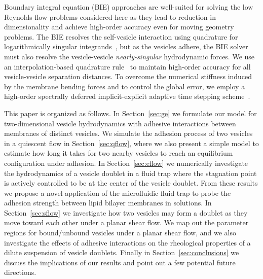 \documentclass[prf,superscriptaddress,showpacs]{revtex4-1}
\begin{document}
Boundary integral equation (BIE) approaches are well-suited for solving
the low Reynolds flow problems considered here as they lead to reduction
in dimensionality and achieve high-order accuracy even for moving
geometry problems. The BIE resolves the self-vesicle interaction using
quadrature for logarithmically singular integrands~\cite{alp1999}, but
as the vesicles adhere, the BIE solver must also resolve the
vesicle-vesicle {\em nearly-singular} hydrodynamic forces.  We use an
interpolation-based quadrature rule~\cite{qua-bir2014} to maintain
high-order accuracy for all vesicle-vesicle separation distances.  To
overcome the numerical stiffness induced by the membrane bending forces
and to control the global error, we employ a high-order spectrally
deferred implicit-explicit adaptive time stepping
scheme~\cite{quaife2016adaptive}. 

This paper is organized as follows. In Section~\ref{sec:ge} we formulate
our model for two-dimensional vesicle hydrodynamics with adhesive
interactions between membranes of distinct vesicles.  We simulate the
adhesion process of two vesicles in a quiescent flow in
Section~\ref{sec:qflow}, where we also present a simple model to
estimate how long it takes for two nearby vesicles to reach an
equilibrium configuration under adhesion. In Section~\ref{sec:eflow} we
numerically investigate the hydrodynamics of a vesicle doublet in a
fluid trap where the stagnation point is actively controlled to be at
the center of the vesicle doublet. From these results we propose a novel
application of the microfluidic fluid trap to probe the adhesion
strength between lipid bilayer membranes in solutions. In
Section~\ref{sec:sflow} we investigate how two vesicles may form a
doublet as they move toward each other under a planar shear flow.  We
map out the parameter regions for bound/unbound vesicles under a planar
shear flow, and we also investigate the effects of adhesive interactions
on the rheological properties of a dilute suspension of vesicle
doublets.  Finally in Section~\ref{sec:conclusions} we discuss the
implications of our results and point out a few potential future
directions.

\end{document}
